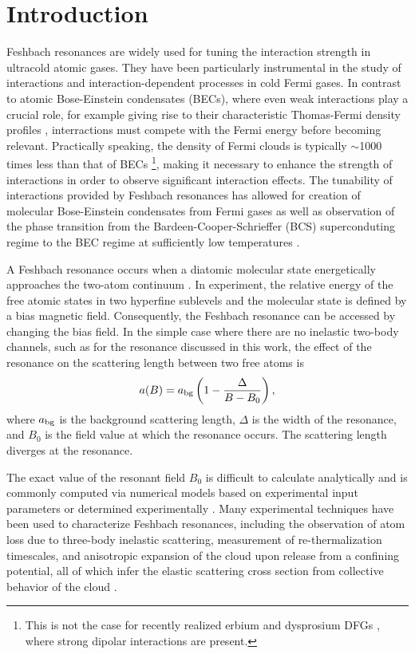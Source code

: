 \documentclass[12pt]{iopart}
\begin{document}
\section{Introduction}
Feshbach resonances are widely used for tuning the interaction strength in ultracold atomic gases. They have been particularly instrumental in the study of interactions and interaction-dependent processes in cold Fermi gases. In contrast to atomic Bose-Einstein condensates (BECs), where even weak interactions play a crucial role, for example giving rise to their characteristic Thomas-Fermi density profiles \cite{KetterleBEC},  interractions must compete with the Fermi energy before becoming relevant. Practically speaking, the density of Fermi clouds is typically $\sim$1000 times less than that of BECs \footnote{This is not the case for recently realized erbium and dysprosium DFGs \cite{Aikawa14,Lu12}, where strong dipolar interactions are present.}, making it necessary to enhance the strength of interactions in order to observe significant interaction effects\cite{KetterleDFG}. The tunability of interactions provided by Feshbach resonances has allowed for creation of molecular Bose-Einstein condensates from Fermi gases \cite{Greiner03,Zwierlein03, Jochim03} as well as observation of the phase transition from the Bardeen-Cooper-Schrieffer (BCS) superconduting regime to the BEC regime at sufficiently low temperatures \cite{Bartenstein04, Bourdel04, Zwierlein04, Regal04}.
\par A Feshbach resonance occurs when a diatomic molecular state energetically approaches the two-atom continuum \cite{Chin10, Timmermans99}. In experiment, the relative energy of the free atomic states in two hyperfine sublevels and the molecular state is defined by a bias magnetic field. Consequently, the Feshbach resonance can be accessed by changing the bias field. In the simple case where there are no inelastic two-body channels, such as for the \K{} resonance discussed in this work, the effect of the resonance on the scattering length between two free atoms is \cite{Chin10}
\begin{equation}
a(B)=a_{\rm{bg}}\left(1-\frac{\Delta}{B-B_0}\right),
\label{feshbachEq}
\end{equation}
where $a_{\rm{bg}}$ is the background scattering length, $\Delta$ is the width of the resonance, and $B_0$ is the field value at which the resonance occurs. The scattering length diverges at the resonance.
\par  The exact value of the resonant field $B_0$ is difficult to calculate analytically and is commonly computed via numerical models based on experimental input parameters \cite{Tiesinga93, Lysebo09, Gao11} or determined experimentally \cite{Inouye98, Cornish00}. Many experimental techniques have been used to characterize Feshbach resonances, including the observation of atom loss due to three-body inelastic scattering, measurement of re-thermalization timescales, and anisotropic expansion of the cloud upon release from a confining potential, all of which infer the elastic scattering cross section from collective behavior of the cloud \cite{Regal03,OHara02,Monroe93}.
\end{document}
